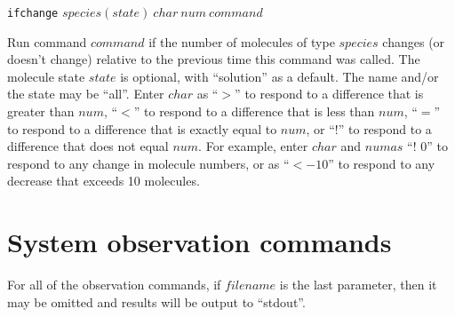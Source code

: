 \documentclass {scrbook}
\newcommand {\ttt} {\texttt}
\begin{document}
\begin{description}
\item{\ttt{ifchange} $species(state)\ char\ num\ command$}

Run command $command$ if the number of molecules of type $species$ changes (or doesn't change) relative to the previous time this command was called. The molecule state $state$ is optional, with ``solution'' as a default. The name and/or the state may be ``all''. Enter $char$ as ``$>$'' to respond to a difference that is greater than $num$, ``$<$'' to respond to a difference that is less than $num$, ``$=$'' to respond to a difference that is exactly equal to $num$, or ``!'' to respond to a difference that does not equal $num$. For example, enter $char$ and $num as$ ``! 0'' to respond to any change in molecule numbers, or as ``$< -10$'' to respond to any decrease that exceeds 10 molecules.

\end{description}

\section{System observation commands}

For all of the observation commands, if $filename$ is the last parameter, then it may be omitted and results will be output to ``stdout''.
\end{document}
